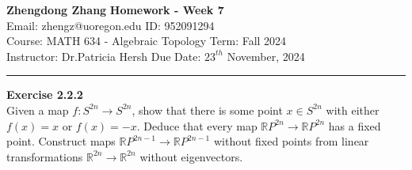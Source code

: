 \documentclass[a4paper, 12pt]{article}
\newenvironment{problem}[2][Exercise]
    { \begin{mdframed}[backgroundcolor=gray!20] \textbf{#1 #2} \\}
    {  \end{mdframed}}
\begin{document}
\noindent
\large\textbf{Zhengdong Zhang} \hfill \textbf{Homework - Week 7}   \\
Email: zhengz@uoregon.edu \hfill ID: 952091294 \\
\normalsize Course: MATH 634 - Algebraic Topology  \hfill Term: Fall 2024\\
Instructor: Dr.Patricia Hersh \hfill Due Date: $23^{th}$ November, 2024 \\
\noindent\rule{7in}{2.8pt}
\begin{problem}{2.2.2}
Given a map \(f:S^{2n}\rightarrow S^{2n}\), show that there is some point \(x\in S^{2n}\) with either \(f(x)=x\) or \(f(x)=-x\). Deduce that every map 
\(\mathbb{R}P^{2n}\rightarrow \mathbb{R}P^{2n}\) has a fixed point. Construct maps \(\mathbb{R}P^{2n-1}\rightarrow \mathbb{R}P^{2n-1}\) without fixed points from linear 
transformations \(\mathbb{R}^{2n}\rightarrow \mathbb{R}^{2n}\) without eigenvectors.
\end{problem}
\end{document}
